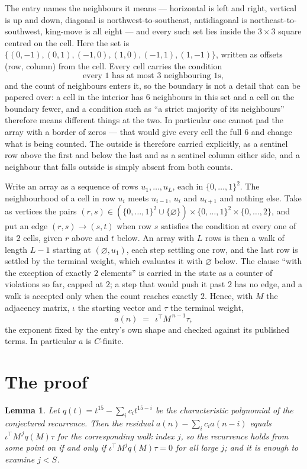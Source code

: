\documentclass[11pt,a4paper]{article}
\theoremstyle{plain}
\newtheorem{lemma}[theorem]{Lemma}
\theoremstyle{definition}
\begin{document}
The entry names the neighbours it means --- horizontal is left and right, vertical is up and
down, diagonal is northwest-to-southeast, antidiagonal is northeast-to-southwest, king-move is
all eight --- and every such set lies inside the $3\times3$ square centred on the cell. Here
the set is $\{(0,-1), (0,1), (-1,0), (1,0), (-1,1), (1,-1)\}$, written as offsets (row, column) from the cell. Every cell carries
the condition
\[
\text{every 1 has at most 3 neighbouring 1s},
\]
and the count of neighbours enters it, so the boundary is not a detail that can be papered
over: a cell in the interior has $6$ neighbours in this set and a cell on the boundary
fewer, and a condition such as ``a strict majority of its neighbours'' therefore means
different things at the two. In particular one cannot pad the array with a border of zeros ---
that would give every cell the full $6$ and change what is being counted. The outside is
therefore carried
explicitly, as a sentinel row above the first and below the last and as a sentinel column
either side, and a neighbour that falls outside is simply absent from both counts.

Write an array as a sequence of rows $u_1,\dots,u_L$, each in
$\{0,\dots,1\}^{2}$. The neighbourhood of a cell in row $u_i$ meets $u_{i-1}$,
$u_i$ and $u_{i+1}$ and nothing else. Take as vertices the pairs
$(r,s)\in(\{0,\dots,1\}^{2}\cup\{\varnothing\})\times\{0,\dots,1\}^{2} \times \{0,\dots,2\}$,
and put an edge $(r,s)\to(s,t)$ when row $s$ satisfies the condition at every one of its
$2$ cells, given $r$ above and $t$ below. An array with $L$ rows is then a walk of length
$L-1$ starting at $(\varnothing,u_1)$, each step settling one row, and the last row is
settled by the terminal weight, which evaluates it with $\varnothing$ below. The clause ``with the exception of exactly $2$ elements'' is carried in
the state as a counter of violations so far, capped at $2$; a step that would push it past
$2$ has no edge, and a walk is accepted only when the count reaches exactly $2$. Hence,
with $M$ the adjacency matrix, $\iota$ the starting vector and $\tau$ the terminal weight,
\[
a(n)\;=\;\,\iota^{\!\top}M^{\,n-1}\tau ,
\]
the exponent fixed by the entry's own shape and checked against its published terms. In
particular $a$ is $C$-finite.

\section{The proof}

\begin{lemma}\label{lem:crit}
Let $q(t)=t^{15}-\sum_i c_it^{15-i}$ be the characteristic polynomial of the
conjectured recurrence. Then the residual $a(n)-\sum_ic_ia(n-i)$ equals
$\iota^{\!\top}M^{\,j}q(M)\tau$ for the corresponding walk index $j$, so the
recurrence holds from some point on if and only if $\iota^{\!\top}M^{j}q(M)\tau=0$ for all
large $j$; and it is enough to examine $j<S$.
\end{lemma}
\end{document}

